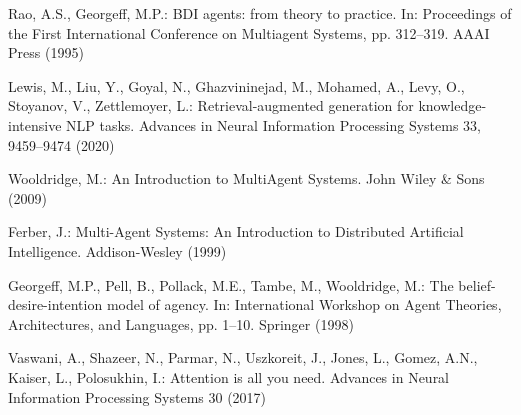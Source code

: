 \documentclass[runningheads,a4paper]{llncs}
\begin{document}
\begin{thebibliography}{8}

Rao, A.S., Georgeff, M.P.:
BDI agents: from theory to practice.
In: Proceedings of the First International Conference on Multiagent Systems, pp. 312--319. AAAI Press (1995)

Lewis, M., Liu, Y., Goyal, N., Ghazvininejad, M., Mohamed, A., Levy, O., Stoyanov, V., Zettlemoyer, L.:
Retrieval-augmented generation for knowledge-intensive NLP tasks.
Advances in Neural Information Processing Systems 33, 9459--9474 (2020)

Wooldridge, M.:
An Introduction to MultiAgent Systems.
John Wiley \& Sons (2009)

Ferber, J.:
Multi-Agent Systems: An Introduction to Distributed Artificial Intelligence.
Addison-Wesley (1999)

Georgeff, M.P., Pell, B., Pollack, M.E., Tambe, M., Wooldridge, M.:
The belief-desire-intention model of agency.
In: International Workshop on Agent Theories, Architectures, and Languages, pp. 1--10. Springer (1998)

Vaswani, A., Shazeer, N., Parmar, N., Uszkoreit, J., Jones, L., Gomez, A.N., Kaiser, L., Polosukhin, I.:
Attention is all you need.
Advances in Neural Information Processing Systems 30 (2017)

\end{thebibliography}
\end{document}
